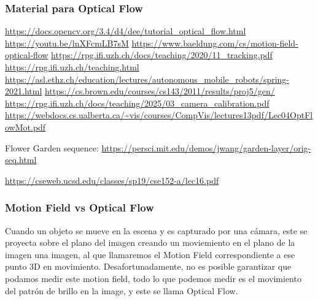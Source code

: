   \begin{frame}
  \frametitle{Material para Optical Flow}
  
  \url{https://docs.opencv.org/3.4/d4/dee/tutorial_optical_flow.html}
  \url{https://youtu.be/lnXFcmLB7sM}
  \url{https://www.baeldung.com/cs/motion-field-optical-flow}
  \url{https://rpg.ifi.uzh.ch/docs/teaching/2020/11_tracking.pdf}
  \url{https://rpg.ifi.uzh.ch/teaching.html}
  \url{https://asl.ethz.ch/education/lectures/autonomous_mobile_robots/spring-2021.html}
  \url{https://cs.brown.edu/courses/cs143/2011/results/proj5/gen/}
  \url{https://rpg.ifi.uzh.ch/docs/teaching/2025/03_camera_calibration.pdf}
  \url{https://webdocs.cs.ualberta.ca/~vis/courses/CompVis/lectures13pdf/Lec04OptFlowMot.pdf}

  Flower Garden sequence: \url{https://persci.mit.edu/demos/jwang/garden-layer/orig-seq.html}

  \url{https://cseweb.ucsd.edu/classes/sp19/cse152-a/lec16.pdf}

\end{frame}

\begin{frame}
  \frametitle{Motion Field vs Optical Flow}
  Cuando un objeto se mueve en la escena y es capturado por una cámara, este se proyecta sobre el plano del imagen creando un moviemiento en el plano de la imagen una imagen, al que llamaremos el Motion Field correspondiente a ese punto 3D en movimiento. Desafortunadamente, no es posible garantizar que podamos medir este motion field, todo lo que podemos medir es el movimiento del patrón de brillo en la image, y este se llama Optical Flow.

\end{frame}

